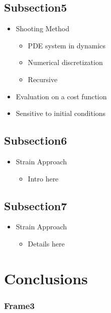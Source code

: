 \documentclass[compress]{thesisbeamer}
\begin{document}
		\subsection{Subsection5}
        \begin{frame}
			\begin{itemize}%
  				\item Shooting Method
  				\begin{itemize}
  					\item PDE system in dynamics
  					\item Numerical discretization
  					\item Recursive
  				\end{itemize}
  				\item Evaluation on a cost function
  				\item Sensitive to initial conditions
 			\end{itemize}
		\end{frame}
		
		\subsection{Subsection6}
        \begin{frame}
			\begin{itemize}%
  				\item Strain Approach
  				\begin{itemize}
  					\item Intro here
  				\end{itemize}
 			\end{itemize}
		\end{frame}
		
		\subsection{Subsection7}
        \begin{frame}
			\begin{itemize}%
  				\item Strain Approach
  				\begin{itemize}
  					\item Details here
  				\end{itemize}
 			\end{itemize}
		\end{frame}

        \section{Conclusions}
        \begin{frame}
            \frametitle{Frame3}
        \end{frame}

        \frame{}
\end{document}
